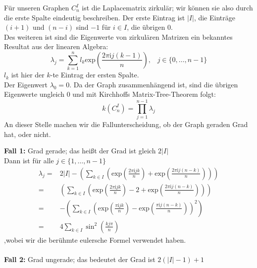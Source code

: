 Für unseren Graphen $C_n^I$ ist die Laplacematrix zirkulär; wir können sie also durch die erste Spalte eindeutig beschreiben. Der erste Eintrag ist $|I|$, die Einträge $(i+1)$  und $(n-i)$ sind $-1$ für $i \in I$, die übrigen $0$.\\
Des weiteren ist sind die Eigenwerte von zirkulären Matrizen ein bekanntes Resultat aus der linearen Algebra:
\begin{equation}
 \lambda_j = \sum_{k=1}^{n}l_k\mathrm{exp}{\left(\frac{2\pi \mathrm{i}j(k-1)}{n}\right)}, \,\,\,\,\, {j\in\{0,\ldots,n-1\}}
 \label{cGE}
\end{equation}
$l_k$ ist hier der $k$-te Eintrag der ersten Spalte.\\ 
Der Eigenwert $\lambda_0 = 0$. Da der Graph zusammenhängend ist, sind die übrigen Eigenwerte ungleich $0$ und mit Kirchhoffs Matrix-Tree-Theorem folgt:
\begin{equation}
 \mathit{k}(C_n^I)=\prod_{j=1}^{n-1} \lambda_j
\end{equation}
An dieser Stelle machen wir die Fallunterscheidung, ob der Graph geraden Grad hat, oder nicht.\\
\par
\begingroup
\leftskip=20pt
\rightskip=20pt
\noindent
\textbf{Fall 1:} Grad gerade; das heißt der Grad ist gleich $2|I|$\\
Dann ist für alle $j \in \{1,\ldots,n-1\}$
\begin{equation}
\begin{aligned}
 \lambda_j = {} & {2|I| - \left( \sum_{k\in I}\left(\mathrm{exp}{\left(\frac{2\pi \mathrm{i}jk}{n}\right)} + \mathrm{exp}{\left(\frac{2\pi \mathrm{i}j(n-k)}{n}\right)}\right)\right)}\\
 = {} & {\left( \sum_{k\in I}\left(\mathrm{exp}{\left(\frac{2\pi \mathrm{i}jk}{n}\right)} - 2 + \mathrm{exp}{\left(\frac{2\pi \mathrm{i}j(n-k)}{n}\right)}\right)\right)}\\
 = {} &-\left( \sum_{k\in I}\left(\mathrm{exp}{\left(\frac{\pi \mathrm{i}jk}{n}\right)} - \mathrm{exp}{\left(\frac{\pi \mathrm{i}j(n-k)}{n}\right)}\right)^2\right)\\
 ={} & 4\sum_{k\in I} \sin^2 \left( \frac{kj\pi}{n}\right)
 \end{aligned}
\end{equation}
,wobei wir die berühmte eulersche Formel verwendet haben.\\
\\ \textbf{Fall 2:} Grad ungerade; das bedeutet der Grad ist $2(|I|-1) + 1$\\
